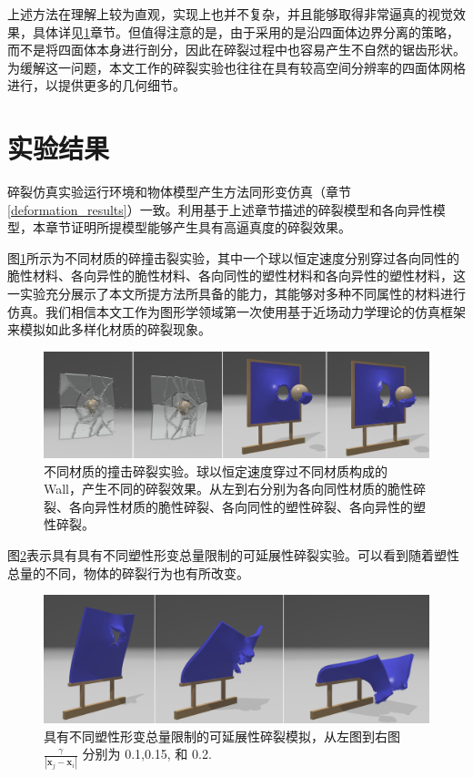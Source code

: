 上述方法在理解上较为直观，实现上也并不复杂，并且能够取得非常逼真的视觉效果，具体详见\ref{fracture_results}章节。但值得注意的是，由于采用的是沿四面体边界分离的策略，而不是将四面体本身进行剖分，因此在碎裂过程中也容易产生不自然的锯齿形状。为缓解这一问题，本文工作的碎裂实验也往往在具有较高空间分辨率的四面体网格进行，以提供更多的几何细节。


\section{实验结果}
\label{fracture_results}
碎裂仿真实验运行环境和物体模型产生方法同形变仿真（章节\ref{deformation_results}）一致。利用基于上述章节描述的碎裂模型和各向异性模型，本章节证明所提模型能够产生具有高逼真度的碎裂效果。

图\ref{demo_impact}所示为不同材质的碎撞击裂实验，其中一个球以恒定速度分别穿过各向同性的脆性材料、各向异性的脆性材料、各向同性的塑性材料和各向异性的塑性材料，这一实验充分展示了本文所提方法所具备的能力，其能够对多种不同属性的材料进行仿真。我们相信本文工作为图形学领域第一次使用基于近场动力学理论的仿真框架来模拟如此多样化材质的碎裂现象。

\begin{figure}[!htb]
  \centering
  \captionsetup{justification=centering}
  \includegraphics[width=\linewidth]{chap/image/demo_impact}

  \caption{\label{demo_impact}
           不同材质的撞击碎裂实验。球以恒定速度穿过不同材质构成的 Wall，产生不同的碎裂效果。从左到右分别为各向同性材质的脆性碎裂、各向异性材质的脆性碎裂、各向同性的塑性碎裂、各向异性的塑性碎裂。
          }
\end{figure}

图\ref{demo_impact_upside_plastic_fracture}表示具有具有不同塑性形变总量限制的可延展性碎裂实验。可以看到随着塑性总量的不同，物体的碎裂行为也有所改变。

\begin{figure}[!htb]
  \centering
  \captionsetup{justification=centering}
  \includegraphics[width=\linewidth]{chap/image/demo_impact_upside_plastic_fracture}

  \caption{\label{demo_impact_upside_plastic_fracture}
           具有不同塑性形变总量限制的可延展性碎裂模拟，从左图到右图 $\frac{\gamma}{|\mathbf{x}_j-\mathbf{x}_i|}$ 分别为 0.1,0.15, 和 0.2.
          }
\end{figure}

